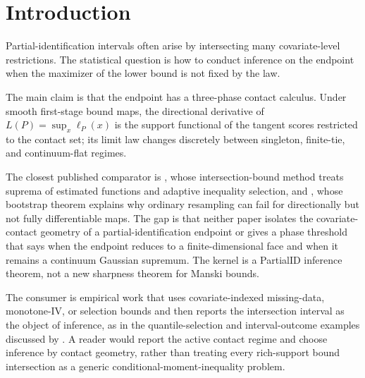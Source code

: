 \documentclass[11pt]{article}
\theoremstyle{definition}
\theoremstyle{plain}
\theoremstyle{remark}
\begin{document}
\section{Introduction}
Partial-identification intervals often arise by intersecting many covariate-level restrictions.  The statistical question is how to conduct inference on the endpoint when the maximizer of the lower bound is not fixed by the law.

The main claim is that the endpoint has a three-phase contact calculus.  Under smooth first-stage bound maps, the directional derivative of \(L(P)=\sup_x\ell_P(x)\) is the support functional of the tangent scores restricted to the contact set; its limit law changes discretely between singleton, finite-tie, and continuum-flat regimes.

The closest published comparator is \citet[pp. 667--737]{ChernozhukovLeeRosen2013}, whose intersection-bound method treats suprema of estimated functions and adaptive inequality selection, and \citet[Section 3]{FangSantos2019}, whose bootstrap theorem explains why ordinary resampling can fail for directionally but not fully differentiable maps.  The gap is that neither paper isolates the covariate-contact geometry of a partial-identification endpoint or gives a phase threshold that says when the endpoint reduces to a finite-dimensional face and when it remains a continuum Gaussian supremum.  The kernel is a PartialID inference theorem, not a new sharpness theorem for Manski bounds.

The consumer is empirical work that uses covariate-indexed missing-data, monotone-IV, or selection bounds and then reports the intersection interval as the object of inference, as in the quantile-selection and interval-outcome examples discussed by \citet{AndrewsShi2013}.  A reader would report the active contact regime and choose inference by contact geometry, rather than treating every rich-support bound intersection as a generic conditional-moment-inequality problem.
\end{document}
